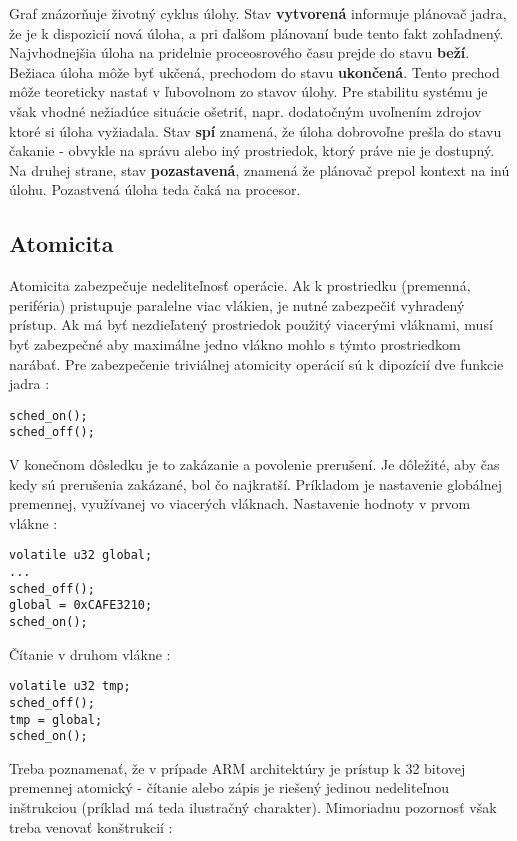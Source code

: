 Graf znázorňuje životný cyklus úlohy. Stav \textbf{vytvorená} informuje plánovač jadra, že je k dispozicií nová úloha, a pri ďalšom plánovaní bude tento fakt zohľadnený. Najvhodnejšia úloha na pridelnie proceosrového času prejde do stavu \textbf{beží}. Bežiaca úloha môže byť ukčená, prechodom do stavu \textbf{ukončená}. Tento prechod môže teoreticky nastať v ľubovolnom zo stavov úlohy. Pre stabilitu systému je však vhodné nežiadúce situácie ošetriť, napr. dodatočným uvoľnením zdrojov ktoré si úloha vyžiadala.
Stav \textbf{spí} znamená, že úloha dobrovoľne prešla do stavu čakanie - obvykle na správu alebo iný prostriedok, ktorý práve nie je dostupný. Na druhej strane, stav \textbf{pozastavená}, znamená že plánovač prepol kontext na inú úlohu. Pozastvená úloha teda čaká na procesor.

\subsection{Atomicita}

Atomicita zabezpečuje nedeliteľnosť operácie. Ak k prostriedku (premenná, periféria) pristupuje paralelne viac vlákien, je nutné zabezpečiť vyhradený prístup. Ak má byť nezdieľatený prostriedok použitý viacerými vláknami, musí byť zabezpečné aby maximálne jedno vlákno mohlo s týmto prostriedkom narábať.
Pre zabezpečenie triviálnej atomicity operácií sú k dipozícií dve funkcie jadra :
{\small
\begin{verbatim}
sched_on();
sched_off();
\end{verbatim}
}

V konečnom dôsledku je to zakázanie a povolenie prerušení. Je dôležité, aby čas kedy sú prerušenia zakázané, bol čo najkratší. Príkladom je nastavenie globálnej premennej, využívanej vo viacerých vláknach. Nastavenie hodnoty v prvom vlákne :
{\small
\begin{verbatim}
volatile u32 global;
...
sched_off();
global = 0xCAFE3210;
sched_on();
\end{verbatim}
}

Čítanie v druhom vlákne :

{\small
\begin{verbatim}
volatile u32 tmp;
sched_off();
tmp = global;
sched_on();
\end{verbatim}
}

Treba poznamenať, že v prípade ARM architektúry je prístup k 32 bitovej premennej atomický - čítanie alebo zápis je riešený jedinou nedeliteľnou inštrukciou (príklad má teda ilustračný charakter). Mimoriadnu pozornosť však treba venovať konštrukcií :

